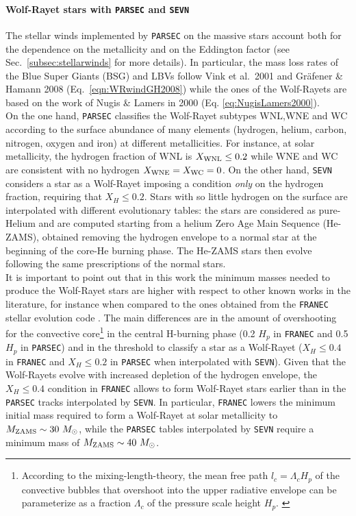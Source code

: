 \documentclass[a4paper,titlepage]{book}     	%
\newcommand{\sun}{\ensuremath{_\odot}}
\newcommand{\mzams}{M_\textup{ZAMS}}
\newcommand{\msun}{\ensuremath{M\sun}}
\begin{document}
\paragraph{Wolf-Rayet stars with \texttt{PARSEC} and \texttt{SEVN}} The stellar winds implemented by \texttt{PARSEC} on the massive stars account both for the dependence on the metallicity and on the Eddington factor (see Sec.\ \ref{subsec:stellarwinds} for more details). In particular, the mass loss rates of the Blue Super Giants (BSG) and LBVs follow Vink et al.\ 2001 and Gr{\"a}fener \& Hamann 2008 (Eq.\ \ref{eqn:WRwindGH2008}) while the ones of the Wolf-Rayets are based on the work of Nugis \& Lamers in 2000 (Eq. \ref{eq:NugisLamers2000}).\\

On the one hand, \texttt{PARSEC} classifies the Wolf-Rayet subtypes WNL,WNE and WC according to the surface abundance of many elements (hydrogen, helium, carbon, nitrogen, oxygen and iron) at different metallicities. For instance, at solar metallicity, the hydrogen fraction of WNL is $X_{\rm WNL} \leq 0.2$ while WNE and WC are consistent with no hydrogen $X_{\rm WNE} = X_{\rm WC} = 0$. On the other hand, \texttt{SEVN} considers a star as a Wolf-Rayet imposing a condition \emph{only} on the hydrogen fraction, requiring that $X_H \leq 0.2$. Stars with so little hydrogen on the surface are interpolated with different evolutionary tables: the stars are considered as pure-Helium and are computed starting from a helium Zero Age Main Sequence (He-ZAMS), obtained removing the hydrogen envelope to a normal star at the beginning of the core-He burning phase. The He-ZAMS stars then evolve following the same prescriptions of the normal stars. \cite{spera2019_mergingBBH}\\

It is important to point out that in this work the minimum masses needed to produce the Wolf-Rayet stars are higher with respect to other known works in the literature, for instance when compared to the ones obtained from the \texttt{FRANEC} stellar evolution code \cite{Limongi2010_preSNevo}. The main differences are in the amount of overshooting for the convective core\footnote{According to the mixing-length-theory, the mean free path $l_c = \Lambda_c H_p$ of the convective bubbles that overshoot into the upper radiative envelope can be parameterize as a fraction $\Lambda_c$ of the pressure scale height $H_p$. \cite{parsec2015_chen}} in the central H-burning phase (0.2 $H_p$ in \texttt{FRANEC} and 0.5 $H_p$ in \texttt{PARSEC}) and in the threshold to classify a star as a Wolf-Rayet ($X_H \leq 0.4$ in \texttt{FRANEC} and $X_H \leq 0.2$ in \texttt{PARSEC} when interpolated with \texttt{SEVN}). Given that the Wolf-Rayets evolve with increased depletion of the hydrogen envelope, the $X_H \leq 0.4$ condition in \texttt{FRANEC} allows to form Wolf-Rayet stars earlier than in the \texttt{PARSEC} tracks interpolated by \texttt{SEVN}. In particular, \texttt{FRANEC} lowers the minimum initial mass required to form a Wolf-Rayet at solar metallicity to $\mzams \sim 30~\msun$, while the \texttt{PARSEC} tables interpolated by \texttt{SEVN} require a minimum mass of $\mzams \sim 40~\msun$. 
\end{document}
